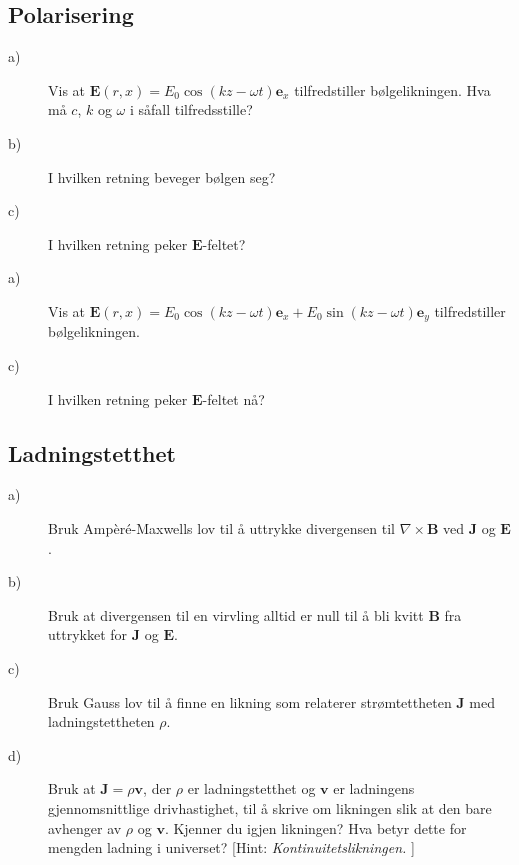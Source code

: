 \documentclass[twoside,utf8]{article}
\begin{document}
\subsection{Polarisering}
\begin{description}
	\item[a)] Vis at $\mathbf{E}(r,x)=E_0\cos(kz-\omega t) \mathbf{e}_x$ tilfredstiller bølgelikningen. Hva må $c$, $k$ og $\omega$ i såfall tilfredsstille?
	\item[b)] I hvilken retning beveger bølgen seg?
	\item[c)] I hvilken retning peker $\mathbf{E}$-feltet?
	\item[a)] Vis at $\mathbf{E}(r,x)=E_0\cos(kz-\omega t) \mathbf{e}_x+E_0\sin(kz-\omega t) \mathbf{e}_y$ tilfredstiller bølgelikningen.
	\item[c)] I hvilken retning peker $\mathbf{E}$-feltet nå?
\end{description}


\subsection{Ladningstetthet}
\begin{description}
	\item[a)] Bruk Ampèré-Maxwells lov til å uttrykke divergensen til $\nabla \times \mathbf{B}$ ved $\mathbf{J}$ og $\mathbf{E}$.
	\item[b)] Bruk at divergensen til en virvling alltid er null til å bli kvitt $\mathbf{B}$ fra uttrykket for $\mathbf{J}$ og $\mathbf{E}$.
	\item[c)] Bruk Gauss lov til å finne en likning som relaterer strømtettheten $\mathbf{J}$ med ladningstettheten $\rho$.
	\item[d)] Bruk at $\mathbf{J}=\rho \mathbf{v}$, der $\rho$ er ladningstetthet og $\mathbf{v}$ er ladningens gjennomsnittlige drivhastighet, til å skrive om likningen slik at den bare avhenger av $\rho$ og $\mathbf{v}$. Kjenner du igjen likningen? Hva betyr dette for mengden ladning i universet?
		[Hint: {\it Kontinuitetslikningen. }]
\end{description}
\end{document}
